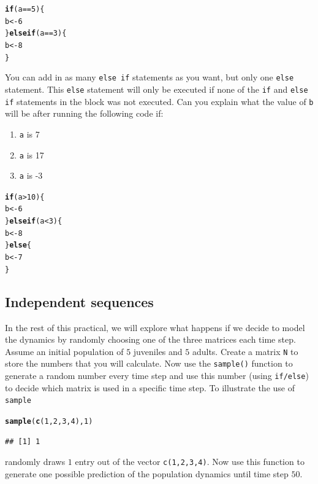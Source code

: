 \documentclass{article}\usepackage[]{graphicx}\usepackage[]{color}
\makeatletter
\newcommand{\hlnum}[1]{\textcolor[rgb]{0.686,0.059,0.569}{#1}}%
\newcommand{\hlopt}[1]{\textcolor[rgb]{0,0,0}{#1}}%
\newcommand{\hlstd}[1]{\textcolor[rgb]{0.345,0.345,0.345}{#1}}%
\newcommand{\hlkwa}[1]{\textcolor[rgb]{0.161,0.373,0.58}{\textbf{#1}}}%
\newcommand{\hlkwb}[1]{\textcolor[rgb]{0.69,0.353,0.396}{#1}}%
\newcommand{\hlkwd}[1]{\textcolor[rgb]{0.737,0.353,0.396}{\textbf{#1}}}%
\newenvironment{kframe}{%
 \def\at@end@of@kframe{}%
 \ifinner\ifhmode%
  \def\at@end@of@kframe{\end{minipage}}%
  \begin{minipage}{\columnwidth}%
 \fi\fi%
 \def\FrameCommand##1{\hskip\@totalleftmargin \hskip-\fboxsep
 \colorbox{shadecolor}{##1}\hskip-\fboxsep
     \hskip-\linewidth \hskip-\@totalleftmargin \hskip\columnwidth}%
 \MakeFramed {\advance\hsize-\width
   \@totalleftmargin\z@ \linewidth\hsize
   \@setminipage}}%
 {\par\unskip\endMakeFramed%
 \at@end@of@kframe}
\newenvironment{knitrout}{}{} %
\makeatother
\begin{document}
\begin{mdframed}
\begin{knitrout}
\begin{kframe}
\begin{alltt}
\hlkwa{if}\hlstd{(a} \hlopt{==} \hlnum{5}\hlstd{)\{}
  \hlstd{b} \hlkwb{<-} \hlnum{6}
\hlstd{\}} \hlkwa{else if}\hlstd{(a} \hlopt{==} \hlnum{3}\hlstd{)\{}
  \hlstd{b} \hlkwb{<-} \hlnum{8}
\hlstd{\}}
\end{alltt}
\end{kframe}
\end{knitrout}
You can add in as many \texttt{else if} statements as you want, but only one \texttt{else} statement. This \texttt{else} statement will only be executed if none of the \texttt{if} and \texttt{else if} statements in the block was not executed. Can you explain what the value of \texttt{b} will be after running the following code if:
\begin{enumerate}
\item \texttt{a} is 7
\item \texttt{a} is 17
\item \texttt{a} is -3
\end{enumerate}
\begin{knitrout}
\color{fgcolor}\begin{kframe}
\begin{alltt}
\hlkwa{if}\hlstd{(a} \hlopt{>} \hlnum{10}\hlstd{)\{}
  \hlstd{b} \hlkwb{<-} \hlnum{6}
\hlstd{\}} \hlkwa{else if}\hlstd{(a} \hlopt{<} \hlnum{3}\hlstd{)\{}
  \hlstd{b} \hlkwb{<-} \hlnum{8}
\hlstd{\}} \hlkwa{else}\hlstd{\{}
  \hlstd{b} \hlkwb{<-} \hlnum{7}
\hlstd{\}}
\end{alltt}
\end{kframe}
\end{knitrout}
\end{mdframed}
\subsection{Independent sequences}
In the rest of this practical, we will explore what happens if we decide to model the dynamics by randomly choosing one of the three matrices each time step. Assume an initial population of $5$ juveniles and $5$ adults. Create a matrix \texttt{N} to store the numbers that you will calculate. Now use the \texttt{sample()} function to generate a random number every time step and use this number (using \texttt{if/else}) to decide which matrix is used in a specific time step. To illustrate the use of \texttt{sample}
\begin{knitrout}
\color{fgcolor}\begin{kframe}
\begin{alltt}
\hlkwd{sample}\hlstd{(}\hlkwd{c}\hlstd{(}\hlnum{1}\hlstd{,}\hlnum{2}\hlstd{,}\hlnum{3}\hlstd{,}\hlnum{4}\hlstd{),}\hlnum{1}\hlstd{)}
\end{alltt}
\begin{verbatim}
## [1] 1
\end{verbatim}
\end{kframe}
\end{knitrout}
randomly draws $1$ entry out of the vector \texttt{c(1,2,3,4)}. Now use this function to generate one possible prediction of the population dynamics until time step $50$.
\end{document}
